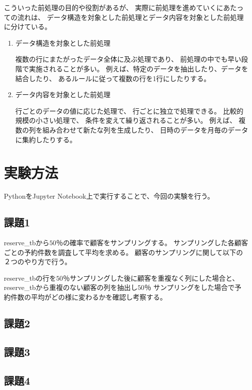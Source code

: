 \documentclass[12pt]{jarticle}
\begin{document}
こういった前処理の目的や役割があるが、
実際に前処理を進めていくにあたっての流れは、
データ構造を対象とした前処理とデータ内容を対象とした前処理に分けている。
\begin{enumerate}
    \item データ構造を対象とした前処理

          複数の行にまたがったデータ全体に及ぶ処理であり、
          前処理の中でも早い段階で実施されることが多い。
          例えば、特定のデータを抽出したり、データを結合したり、
          あるルールに従って複数の行を1行にしたりする。

    \item データ内容を対象とした前処理

          行ごとのデータの値に応じた処理で、
          行ごとに独立で処理できる。
          比較的規模の小さい処理で、
          条件を変えて繰り返されることが多い。
          例えば、
          複数の列を組み合わせて新たな列を生成したり、
          日時のデータを月毎のデータに集約したりする。
\end{enumerate}

\clearpage

\section{実験方法}
PythonをJupyter Notebook上で実行することで、今回の実験を行う。


\subsection{課題1}
reserve\_tbから$50％$の確率で顧客をサンプリングする。
サンプリングした各顧客ごとの予約件数を調査して平均を求める。
顧客のサンプリングに関して以下の２つのやり方で行う。

reserve\_tbの行を$50％$サンプリングした後に顧客を重複なく列にした場合と、
reserve\_tbから重複のない顧客の列を抽出し$50％$
サンプリングをした場合で予約件数の平均がどの様に変わるかを確認し考察する。

\subsection{課題2}
\subsection{課題3}
\subsection{課題4}
\end{document}
